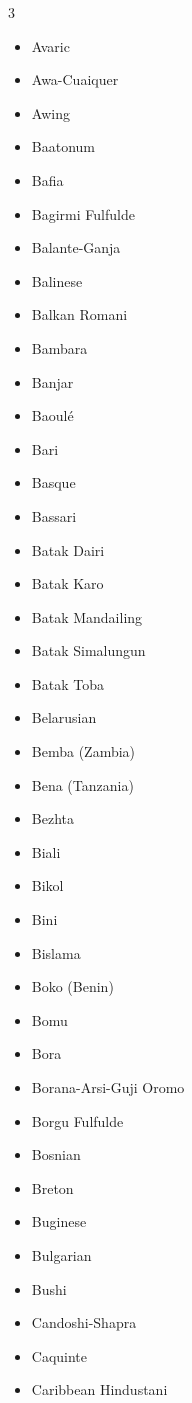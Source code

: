 \documentclass[paper=a4, 10pt]{scrbook}
\begin{document}
\begin{multicols}{3}
\begin{itemize}
        \item Avaric
        \item Awa-Cuaiquer
        \item Awing
        \item Baatonum
        \item Bafia
        \item Bagirmi Fulfulde
        \item Balante-Ganja
        \item Balinese
        \item Balkan Romani
        \item Bambara
        \item Banjar
        \item Baoulé
        \item Bari
        \item Basque
        \item Bassari
        \item Batak Dairi
        \item Batak Karo
        \item Batak Mandailing
        \item Batak Simalungun
        \item Batak Toba
        \item Belarusian
        \item Bemba (Zambia)
        \item Bena (Tanzania)
        \item Bezhta
        \item Biali
        \item Bikol
        \item Bini
        \item Bislama
        \item Boko (Benin)
        \item Bomu
        \item Bora
        \item Borana-Arsi-Guji Oromo
        \item Borgu Fulfulde
        \item Bosnian
        \item Breton
        \item Buginese
        \item Bulgarian
        \item Bushi
        \item Candoshi-Shapra
        \item Caquinte
        \item Caribbean Hindustani

\end{itemize}
\end{multicols}
\end{document}
